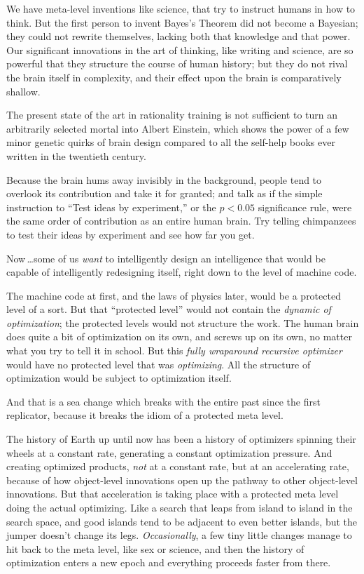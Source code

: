  We have meta-level inventions like science, that try to instruct
humans in how to think. But the first person to invent
Bayes's Theorem did not become a Bayesian; they could
not rewrite themselves, lacking both that knowledge and that power. Our
significant innovations in the art of thinking, like writing and
science, are so powerful that they structure the course of human
history; but they do not rival the brain itself in complexity, and
their effect upon the brain is comparatively shallow.


 The present state of the art in rationality training is not
sufficient to turn an arbitrarily selected mortal into Albert Einstein,
which shows the power of a few minor genetic quirks of brain design
compared to all the self-help books ever written in the twentieth
century.


 Because the brain hums away invisibly in the background, people
tend to overlook its contribution and take it for granted; and talk as
if the simple instruction to ``Test ideas by
experiment,'' or the $p < 0.05$ significance
rule, were the same order of contribution as an entire human brain. Try
telling chimpanzees to test their ideas by experiment and see how far
you get.


 Now\,\ldots some of us \textit{want} to intelligently design an
intelligence that would be capable of intelligently redesigning itself,
right down to the level of machine code.


 The machine code at first, and the laws of physics later, would be
a protected level of a sort. But that ``protected
level'' would not contain the \textit{dynamic of
optimization}; the protected levels would not structure the work. The
human brain does quite a bit of optimization on its own, and screws up
on its own, no matter what you try to tell it in school. But this
\textit{fully wraparound recursive optimizer} would have no protected
level that was \textit{optimizing}. All the structure of optimization
would be subject to optimization itself.


 And that is a sea change which breaks with the entire past since
the first replicator, because it breaks the idiom of a protected meta
level.


 The history of Earth up until now has been a history of optimizers
spinning their wheels at a constant rate, generating a constant
optimization pressure. And creating optimized products, \textit{not} at
a constant rate, but at an accelerating rate, because of how
object-level innovations open up the pathway to other object-level
innovations. But that acceleration is taking place with a protected
meta level doing the actual optimizing. Like a search that leaps from
island to island in the search space, and good islands tend to be
adjacent to even better islands, but the jumper doesn't
change its legs. \textit{Occasionally}, a few tiny little changes
manage to hit back to the meta level, like sex or science, and then the
history of optimization enters a new epoch and everything proceeds
faster from there.


